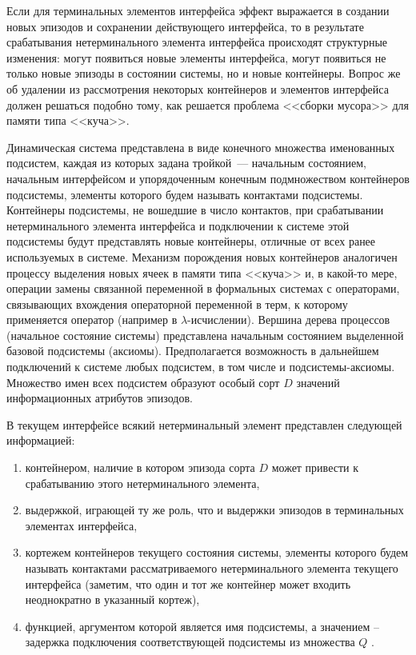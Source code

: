 Если для терминальных элементов интерфейса эффект выражается в создании новых эпизодов и сохранении действующего интерфейса, то в результате срабатывания нетерминального элемента интерфейса происходят структурные изменения: могут появиться новые элементы интерфейса, могут появиться не только новые эпизоды в состоянии системы, но и новые контейнеры. 
Вопрос же об удалении из рассмотрения некоторых контейнеров и элементов интерфейса должен решаться подобно тому, как решается проблема <<сборки мусора>> для памяти типа <<куча>>.

Динамическая система представлена в виде конечного множества именованных подсистем, каждая из которых задана тройкой~--- начальным состоянием, начальным интерфейсом и упорядоченным конечным подмножеством контейнеров подсистемы, элементы которого будем называть контактами подсистемы. 
Контейнеры подсистемы, не вошедшие в число контактов, при срабатывании нетерминального элемента интерфейса и подключении к системе этой подсистемы будут представлять новые контейнеры, отличные от всех ранее используемых в системе. 
Механизм порождения новых контейнеров аналогичен процессу выделения новых ячеек в памяти типа <<куча>> и, в какой-то мере, операции замены связанной переменной в формальных системах с операторами, связывающих вхождения операторной переменной в терм, к которому применяется оператор (например в $ \lambda $-исчислении). 
Вершина дерева процессов (начальное состояние системы) представлена начальным состоянием выделенной базовой подсистемы (аксиомы). 
Предполагается возможность в дальнейшем подключений к системе любых подсистем, в том числе и подсистемы-аксиомы. 
Множество имен всех подсистем образуют особый сорт $ D $ значений информационных атрибутов эпизодов.

В текущем интерфейсе всякий нетерминальный элемент представлен следующей информацией: 
\begin{enumerate}[label=1)]
	\item контейнером, наличие в котором эпизода сорта $ D $   может привести к срабатыванию этого нетерминального элемента, 
	\item  выдержкой, играющей ту же роль, что и выдержки эпизодов в терминальных элементах интерфейса, 
	\item  кортежем контейнеров текущего состояния системы, элементы которого будем называть контактами рассматриваемого нетерминального элемента текущего интерфейса (заметим, что один и тот же контейнер может входить неоднократно в указанный кортеж), 
	\item  функцией, аргументом которой является имя подсистемы, а значением – задержка подключения соответствующей подсистемы из множества $ Q $ .
\end{enumerate}  

